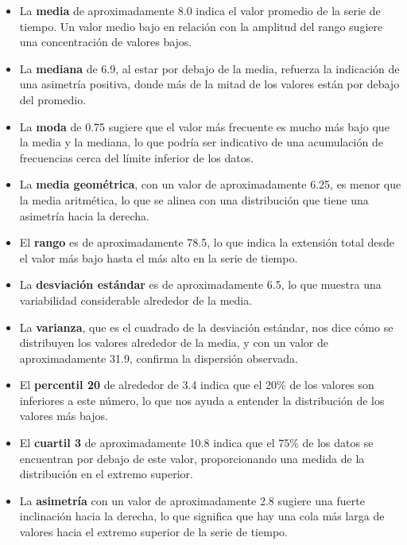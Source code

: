 \documentclass[11pt]{article} %
\begin{document}
	\begin{itemize}
		\item La \textbf{media} de aproximadamente 8.0 indica el valor promedio de la serie de tiempo. Un valor medio bajo en relación con la amplitud del rango sugiere una concentración de valores bajos.
		
		\item La \textbf{mediana} de 6.9, al estar por debajo de la media, refuerza la indicación de una asimetría positiva, donde más de la mitad de los valores están por debajo del promedio.
		
		\item La \textbf{moda} de 0.75 sugiere que el valor más frecuente es mucho más bajo que la media y la mediana, lo que podría ser indicativo de una acumulación de frecuencias cerca del límite inferior de los datos.
		
		\item La \textbf{media geométrica}, con un valor de aproximadamente 6.25, es menor que la media aritmética, lo que se alinea con una distribución que tiene una asimetría hacia la derecha.
		
		\item El \textbf{rango} es de aproximadamente 78.5, lo que indica la extensión total desde el valor más bajo hasta el más alto en la serie de tiempo.
		
		\item La \textbf{desviación estándar} es de aproximadamente 6.5, lo que muestra una variabilidad considerable alrededor de la media.
		
		\item La \textbf{varianza}, que es el cuadrado de la desviación estándar, nos dice cómo se distribuyen los valores alrededor de la media, y con un valor de aproximadamente 31.9, confirma la dispersión observada.
		
		\item El \textbf{percentil 20} de alrededor de 3.4 indica que el 20\% de los valores son inferiores a este número, lo que nos ayuda a entender la distribución de los valores más bajos.
		
		\item El \textbf{cuartil 3} de aproximadamente 10.8 indica que el 75\% de los datos se encuentran por debajo de este valor, proporcionando una medida de la distribución en el extremo superior.
		
		\item La \textbf{asimetría} con un valor de aproximadamente 2.8 sugiere una fuerte inclinación hacia la derecha, lo que significa que hay una cola más larga de valores hacia el extremo superior de la serie de tiempo.
		

\end{itemize}
\end{document}
